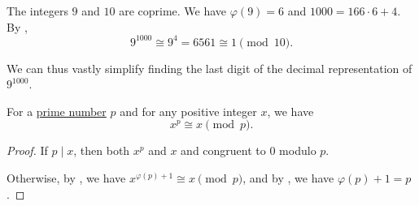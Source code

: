 \begin{example}\label{ex:division_modulo}
  The integers \( 9 \) and \( 10 \) are coprime. We have \( \varphi(9) = 6 \) and \( 1000 = 166 \cdot 6 + 4 \). By ,
  \begin{equation*}
    9^{1000} \cong 9^4 = 6561 \cong 1 \pmod {10}.
  \end{equation*}

  We can thus vastly simplify finding the last digit of the decimal representation of \( 9^{1000} \).
\end{example}

\begin{theorem}\label{thm:fermats_little_theorem}
  For a \hyperref[def:prime_number]{prime number} \( p \) and for any positive integer \( x \), we have
  \begin{equation*}
    x^p \cong x \pmod p.
  \end{equation*}
\end{theorem}
\begin{proof}
  If \( p \mid x \), then both \( x^p \) and \( x \) and congruent to \( 0 \) modulo \( p \).

  Otherwise, by , we have \( x^{\varphi(p) + 1} \cong x \pmod p \), and by , we have \( \varphi(p) + 1 = p \).
\end{proof}
